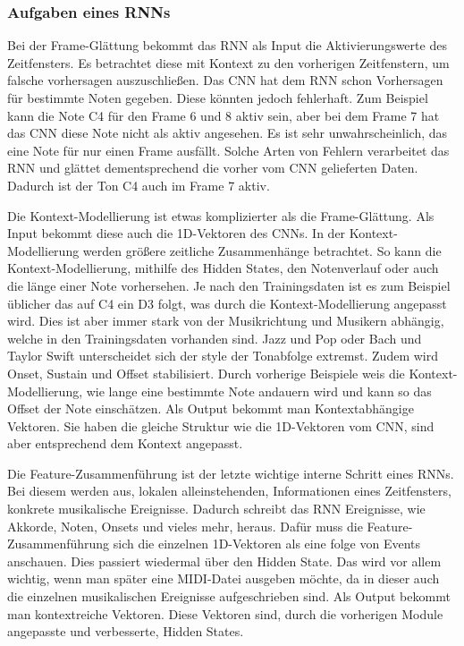 \subsubsection{Aufgaben eines RNNs}
Bei der Frame-Glättung bekommt das RNN als Input die Aktivierungswerte des Zeitfensters.
Es betrachtet diese mit Kontext zu den vorherigen Zeitfenstern, um falsche vorhersagen auszuschließen.
Das CNN hat dem RNN schon Vorhersagen für bestimmte Noten gegeben.
Diese könnten jedoch fehlerhaft.
Zum Beispiel kann die Note C4 für den Frame 6 und 8 aktiv sein,
aber bei dem Frame 7 hat das CNN diese Note nicht als aktiv angesehen.
Es ist sehr unwahrscheinlich, das eine Note für nur einen Frame ausfällt.
Solche Arten von Fehlern verarbeitet das RNN und glättet dementsprechend die vorher vom CNN gelieferten Daten.
Dadurch ist der Ton C4 auch im Frame 7 aktiv.

Die Kontext-Modellierung ist etwas komplizierter als die Frame-Glättung.
Als Input bekommt diese auch die 1D-Vektoren des CNNs.
In der Kontext-Modellierung werden größere zeitliche Zusammenhänge betrachtet.
So kann die Kontext-Modellierung, mithilfe des Hidden States,
den Notenverlauf oder auch die länge einer Note vorhersehen.
Je nach den Trainingsdaten ist es zum Beispiel üblicher das auf C4 ein D3 folgt,
was durch die Kontext-Modellierung angepasst wird.
Dies ist aber immer stark von der Musikrichtung und Musikern abhängig, welche in den Trainingsdaten vorhanden sind.
Jazz und Pop oder Bach und Taylor Swift unterscheidet sich der style der Tonabfolge extremst.
Zudem wird Onset, Sustain und Offset stabilisiert.
Durch vorherige Beispiele weis die Kontext-Modellierung,
wie lange eine bestimmte Note andauern wird und kann so das Offset der Note einschätzen.
Als Output bekommt man Kontextabhängige Vektoren.
Sie haben die gleiche Struktur wie die 1D-Vektoren vom CNN, sind aber entsprechend dem Kontext angepasst.

Die Feature-Zusammenführung ist der letzte wichtige interne Schritt eines RNNs.
Bei diesem werden aus, lokalen alleinstehenden, Informationen eines Zeitfensters, konkrete musikalische Ereignisse.
Dadurch schreibt das RNN Ereignisse, wie Akkorde, Noten, Onsets und vieles mehr, heraus.
Dafür muss die Feature-Zusammenführung sich die einzelnen 1D-Vektoren als eine folge von Events anschauen.
Dies passiert wiedermal über den Hidden State.
Das wird vor allem wichtig, wenn man später eine MIDI-Datei ausgeben möchte,
da in dieser auch die einzelnen musikalischen Ereignisse aufgeschrieben sind.
Als Output bekommt man kontextreiche Vektoren.
Diese Vektoren sind, durch die vorherigen Module angepasste und verbesserte, Hidden States.

